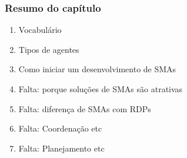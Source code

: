 \begin{frame} %

 \frametitle{Resumo do capítulo}

\begin{enumerate}
  \item Vocabulário
  \item Tipos de agentes
  \item Como iniciar um desenvolvimento de SMAs 
  \item Falta: porque soluções de SMAs são atrativas
    \item Falta: diferença de SMAs com RDPs
    \item Falta: Coordenação etc
        \item Falta: Planejamento etc
    
\end{enumerate}


\end{frame}
